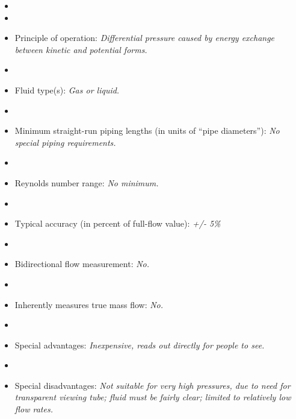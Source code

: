 \documentclass[12pt,a4paper]{article}
\begin{document}
\begin{itemize}
\goodbreak
\item{} 
\vskip 5pt
\item\item{} Principle of operation: {\it Differential pressure caused by energy exchange between kinetic and potential forms.}
\vskip 5pt
\item\item{} Fluid type(s): {\it Gas or liquid.}
\vskip 5pt
\item\item{} Minimum straight-run piping lengths (in units of ``pipe diameters''): {\it No special piping requirements.}
\vskip 5pt
\item\item{} Reynolds number range: {\it No minimum.}
\vskip 5pt
\item\item{} Typical accuracy (in percent of full-flow value): {\it +/- 5\%}
\vskip 5pt
\item\item{} Bidirectional flow measurement: {\it No.}
\vskip 5pt
\item\item{} Inherently measures true mass flow: {\it No.}
\vskip 5pt
\item\item{} Special advantages: {\it Inexpensive, reads out directly for people to see.}
\vskip 5pt
\item\item{} Special disadvantages: {\it Not suitable for very high pressures, due to need for transparent viewing tube; fluid must be fairly clear; limited to relatively low flow rates.}
\end{itemize}
\end{document}
